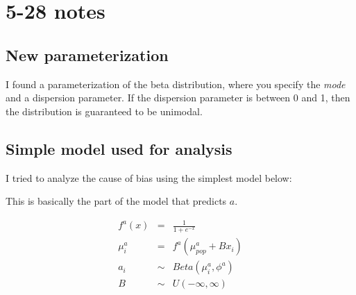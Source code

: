 \section{5-28 notes}
\subsection{New parameterization}
I found a parameterization of the beta distribution, where you specify the \emph{mode} and a dispersion parameter.  If the dispersion parameter is between 0 and 1, then the distribution is guaranteed to be unimodal.

\subsection{Simple model used for analysis}
I tried to analyze the cause of bias using the simplest model below:

This is basically the part of the model that predicts $a$.

\begin{eqnarray}
f^a(x) &=& \frac{1}{1+e^{-x}} \\
\mu_i^a &=& f^a(\mu_{pop}^a + Bx_i) \\
a_i &\sim& Beta(\mu_i^a, \phi^a) \\
B &\sim& U(-\infty,\infty)
\end{eqnarray}

